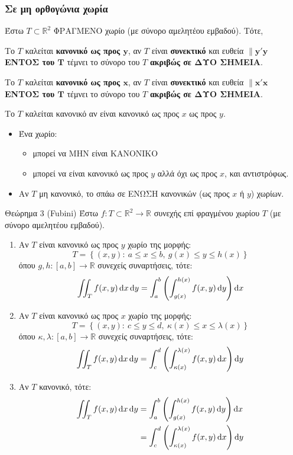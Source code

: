 \documentclass[11pt,a4paper,titlepage,draft]{article}
\begin{document}
\subsubsection{Σε μη ορθογώνια χωρία}
Έστω \(T \subset  \mathbb R ^2\) ΦΡΑΓΜΕΝΟ χωρίο (με σύνορο αμελητέου εμβαδού). Τότε,
\begin{enumlatin}
\item Το \(T\) καλείται \textbf{κανονικό ως προς \(\mathbf y\)}, αν \(T\) είναι \textbf{συνεκτικό} και  ευθεία \(\parallel \mathbf{y'y}\) \textbf{ΕΝΤΟΣ του \(\mathbf T\)} τέμνει το σύνορο του \(T\) \textbf{ακριβώς σε ΔΥΟ ΣΗΜΕΙΑ}.
\item Το \(T\) καλείται \textbf{κανονικό ως προς \(\mathbf x\)}, αν \(T\) είναι \textbf{συνεκτικό} και  ευθεία \(\parallel \mathbf{x'x}\) \textbf{ΕΝΤΟΣ του \(\mathbf T\)} τέμνει το σύνορο του \(T\) \textbf{ακριβώς σε ΔΥΟ ΣΗΜΕΙΑ}.
\item Το \(T\) καλείται κανονικό αν είναι κανονικό ως προς \(x\)  ως προς \(y\).
\end{enumlatin}

\begin{itemize}
\item Ένα χωρίο:
\begin{itemize}
\item μπορεί να ΜΗΝ είναι ΚΑΝΟΝΙΚΟ
\item μπορεί να είναι κανονικό ως προς \(y\) αλλά όχι ως προς \(x\), και αντιστρόφως.
\end{itemize}
\item Αν \(T\) μη κανονικό, το σπάω σε ΕΝΩΣΗ κανονικών (ως προς \(x\) ή $y$) χωρίων.
\end{itemize}

\begin{attnbox}{Θεώρημα 3 (\textlatin{Fubini})}
Έστω \(f: T \subset  \mathbb R ^2 \to  \mathbb R \) συνεχής επί φραγμένου χωρίου \(T\) (με σύνορο αμελητέου εμβαδού).
\begin{enumerate}
\item Αν \(T\) είναι κανονικό ως προς \(y\) χωρίο της μορφής:
\[
T =  \left\lbrace (x,y):\ a \leq x \leq b, \ g(x) \leq y \leq h(x)  \right\rbrace
\]
όπου \(g,h: [a,b] \to  \mathbb R \) συνεχείς συναρτήσεις, τότε:
\[
\iint_T f(x,y) \dif x \dif y =
\int_a^b \left(
\int_{g(x)}^{h(x)} f(x,y) \dif y
\right) \dif x
\]
\item Αν \(T\) είναι κανονικό ως προς \(x\) χωρίο της μορφής:
\[
T =  \left\lbrace (x,y):\ c \leq y \leq d, \ \kappa (x) \leq x \leq \lambda(x)  \right\rbrace
\]
όπου \(\kappa,\lambda: [a,b] \to  \mathbb R \) συνεχείς συναρτήσεις, τότε:
\[
\iint_T f(x,y) \dif x \dif y =
\int_c^d \left(
\int_{\kappa(x)}^{\lambda(x)} f(x,y) \dif x
\right) \dif y
\]
\item Αν \(T\) κανονικό, τότε:
\begin{align*}
\iint_T f(x,y)\dif x \dif y
&=
\int_a^b \left(
\int_{g(x)}^{h(x)} f(x,y) \dif y
\right) \dif x \\
&=
\int_c^d \left(
\int_{\kappa(x)}^{\lambda(x)} f(x,y) \dif x
\right) \dif y
\end{align*}
\end{enumerate}
\end{attnbox}
\end{document}
